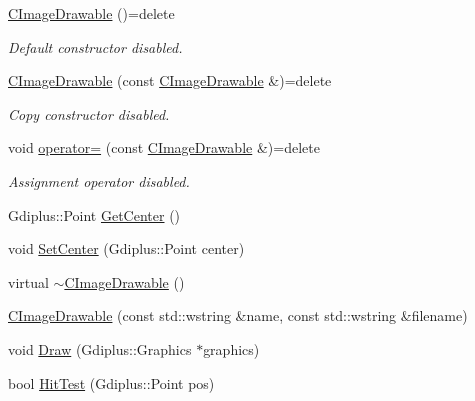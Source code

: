 \begin{DoxyCompactItemize}
\item 
\hypertarget{class_c_image_drawable_a0af067ad80ece0bea046dded19c5b9d4}{\hyperlink{class_c_image_drawable_a0af067ad80ece0bea046dded19c5b9d4}{C\+Image\+Drawable} ()=delete}\label{class_c_image_drawable_a0af067ad80ece0bea046dded19c5b9d4}

\begin{DoxyCompactList}\small\item\em Default constructor disabled. \end{DoxyCompactList}\item 
\hypertarget{class_c_image_drawable_a2955356238c638373d39ed99c5422cf3}{\hyperlink{class_c_image_drawable_a2955356238c638373d39ed99c5422cf3}{C\+Image\+Drawable} (const \hyperlink{class_c_image_drawable}{C\+Image\+Drawable} \&)=delete}\label{class_c_image_drawable_a2955356238c638373d39ed99c5422cf3}

\begin{DoxyCompactList}\small\item\em Copy constructor disabled. \end{DoxyCompactList}\item 
\hypertarget{class_c_image_drawable_a717129f6ce9e9fa5d9a512a85a33a8b1}{void \hyperlink{class_c_image_drawable_a717129f6ce9e9fa5d9a512a85a33a8b1}{operator=} (const \hyperlink{class_c_image_drawable}{C\+Image\+Drawable} \&)=delete}\label{class_c_image_drawable_a717129f6ce9e9fa5d9a512a85a33a8b1}

\begin{DoxyCompactList}\small\item\em Assignment operator disabled. \end{DoxyCompactList}\item 
Gdiplus\+::\+Point \hyperlink{class_c_image_drawable_adaf3918b7eafe6c3db2c73ffa317f114}{Get\+Center} ()
\item 
void \hyperlink{class_c_image_drawable_a11c2376e3516076e7e737a5a266f1c49}{Set\+Center} (Gdiplus\+::\+Point center)
\item 
virtual \hyperlink{class_c_image_drawable_a4ecb6e494ba125a2d503bfff1260c2fe}{$\sim$\+C\+Image\+Drawable} ()
\item 
\hyperlink{class_c_image_drawable_a0a036788340edfd1765ae6a05cee31a0}{C\+Image\+Drawable} (const std\+::wstring \&name, const std\+::wstring \&filename)
\item 
void \hyperlink{class_c_image_drawable_abf591e6f5e92537119ab745eba054bd1}{Draw} (Gdiplus\+::\+Graphics $\ast$graphics)
\item 
bool \hyperlink{class_c_image_drawable_ac9f173d9fcb21dbb45f4cbf4593a6984}{Hit\+Test} (Gdiplus\+::\+Point pos)
\end{DoxyCompactItemize}
